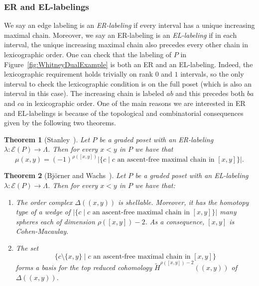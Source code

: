 \documentclass[11pt]{article}
\newtheorem{theo}{Theorem}[section]
\theoremstyle{definition}
\numberwithin{equation}{section}
\begin{document}
\subsubsection{ER and EL-labelings}
We say an edge labeling is an \emph{ER-labeling} if every interval has a unique increasing maximal chain.  Moreover, we say an ER-labeling is an \emph{EL-labeling} if in each interval, the unique increasing maximal chain also precedes every other chain in lexicographic order.  One can check that the labeling of $P$ in   Figure~\ref{fig:WhitneyDualExample} is both an ER and an EL-labeling. Indeed, the lexicographic requirement holds trivially on rank $0$ and $1$ intervals, so the only interval to check the  lexicographic condition is on the full poset (which is also an interval in this case).  The increasing chain is labeled $ab$ and this precedes both $ba$ and $ca$ in lexicographic order.   One of the main reasons we are interested in ER and EL-labelings is because of the topological and combinatorial consequences given by the following two theorems. 

\begin{theo}[Stanley~\cite{Stanley1974}]
\label{theorem:stanley_mobius}
  Let $P$ be a graded poset  with an ER-labeling $\lambda: \mathcal{E}(P) \rightarrow \Lambda$. Then  for  every $x<y$ in $P$  we have that
     $$
     \mu(x,y) = (-1)^{\rho([x,y])} |\{c\mid c \mbox{ an ascent-free maximal chain in  }[x,y]\}|.
     $$
\end{theo}


\begin{theo}  [Bj\"orner and Wachs~\cite{BjornerWachs1983}]\label{theorem:bjorner_wachs}
  Let $P$ be a graded poset  with an EL-labeling $\lambda: \mathcal{E}(P) \rightarrow \Lambda$. Then for  every $x<y$ in $P$  we have that:
 \begin{enumerate}
   \item   The order complex $\Delta((x,y))$ is shellable. Moreover, it has the homotopy type of a wedge of $|\{c\mid c\mbox{ an ascent-free maximal chain in }[x,y]\}|$ many spheres each of dimension $\rho([x,y])-2$. As a consequence, $[x,y]$ is Cohen-Macaulay.

\item The set
$$ \{c\setminus \{x,y\} \mid c \mbox{ an ascent-free maximal  chain in  }[x,y]\}$$ forms a basis for the top reduced cohomology $\widetilde H^{\rho([x,y])-2}((x,y))$ of  $\Delta((x,y))$.
 \end{enumerate}
\end{theo}
\end{document}
